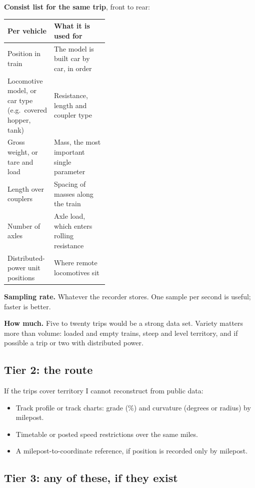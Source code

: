 \documentclass[11pt]{article}
\begin{document}
\medskip
\textbf{Consist list for the same trip}, front to rear:

\smallskip
\begin{tabularx}{\linewidth}{@{}>{\raggedright\arraybackslash}p{0.40\linewidth} L@{}}
\toprule
\textbf{Per vehicle} & \textbf{What it is used for} \\
\midrule
Position in train & The model is built car by car, in order \\
Locomotive model, or car type (e.g.\ covered hopper, tank) & Resistance, length and coupler type \\
Gross weight, or tare and load & Mass, the most important single parameter \\
Length over couplers & Spacing of masses along the train \\
Number of axles & Axle load, which enters rolling resistance \\
Distributed-power unit positions & Where remote locomotives sit \\
\bottomrule
\end{tabularx}

\medskip
\textbf{Sampling rate.} Whatever the recorder stores. One sample per second
is useful; faster is better.

\textbf{How much.} Five to twenty trips would be a strong data set. Variety
matters more than volume: loaded and empty trains, steep and level
territory, and if possible a trip or two with distributed power.

\subsection*{Tier 2: the route}

If the trips cover territory I cannot reconstruct from public data:
\begin{itemize}
  \item Track profile or track charts: grade (\%) and curvature (degrees or
    radius) by milepost.
  \item Timetable or posted speed restrictions over the same miles.
  \item A milepost-to-coordinate reference, if position is recorded only by
    milepost.
\end{itemize}

\subsection*{Tier 3: any of these, if they exist}
\end{document}
